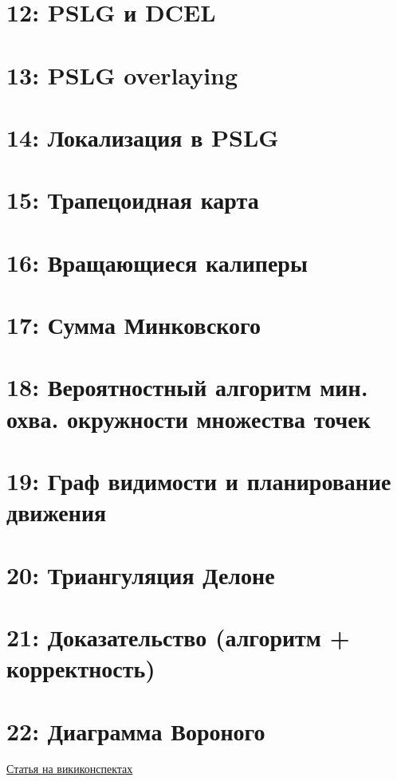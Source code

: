 \documentclass[11pt]{article}
\begin{document}
\section{{\bfseries{}} 12: PSLG и DCEL}
\label{sec-14}
\section{{\bfseries{}} 13: PSLG overlaying}
\label{sec-15}
\section{{\bfseries{}} 14: Локализация в PSLG}
\label{sec-16}
\section{{\bfseries{}} 15: Трапецоидная карта}
\label{sec-17}
\section{{\bfseries{}} 16: Вращающиеся калиперы}
\label{sec-18}
\section{{\bfseries{}} 17: Сумма Минковского}
\label{sec-19}
\section{{\bfseries{}} 18: Вероятностный алгоритм мин. охва. окружности множества точек}
\label{sec-20}
\section{{\bfseries{}} 19: Граф видимости и планирование движения}
\label{sec-21}
\section{{\bfseries{}} 20: Триангуляция Делоне}
\label{sec-22}
\section{{\bfseries{}} 21: Доказательство (алгоритм + корректность)}
\label{sec-23}
\section{{\bfseries{}} 22: Диаграмма Вороного}
\label{sec-24}
\href{http://neerc.ifmo.ru/wiki/index.php?title=Диаграмма_Вороного}{Статья на викиконспектах}
\end{document}
